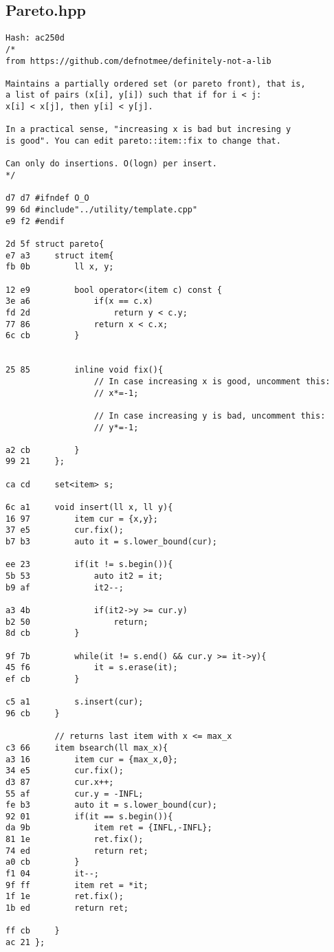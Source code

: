 \documentclass[11pt, a4paper, twoside]{article}
\begin{document}
\subsection{Pareto.hpp}
\begin{lstlisting}
Hash: ac250d
/*
from https://github.com/defnotmee/definitely-not-a-lib

Maintains a partially ordered set (or pareto front), that is,
a list of pairs (x[i], y[i]) such that if for i < j:
x[i] < x[j], then y[i] < y[j].

In a practical sense, "increasing x is bad but incresing y
is good". You can edit pareto::item::fix to change that.

Can only do insertions. O(logn) per insert.
*/

d7 d7 #ifndef O_O
99 6d #include"../utility/template.cpp"
e9 f2 #endif

2d 5f struct pareto{
e7 a3     struct item{
fb 0b         ll x, y;
      
12 e9         bool operator<(item c) const {
3e a6             if(x == c.x)
fd 2d                 return y < c.y;
77 86             return x < c.x;
6c cb         }
      
              
25 85         inline void fix(){
                  // In case increasing x is good, uncomment this:
                  // x*=-1;
      
                  // In case increasing y is bad, uncomment this:
                  // y*=-1;
                  
a2 cb         }
99 21     };
      
ca cd     set<item> s;
      
6c a1     void insert(ll x, ll y){
16 97         item cur = {x,y};
37 e5         cur.fix();
b7 b3         auto it = s.lower_bound(cur);
      
ee 23         if(it != s.begin()){
5b 53             auto it2 = it;
b9 af             it2--;
      
a3 4b             if(it2->y >= cur.y)
b2 50                 return;
8d cb         }
      
9f 7b         while(it != s.end() && cur.y >= it->y){
45 f6             it = s.erase(it);
ef cb         }
      
c5 a1         s.insert(cur);
96 cb     }
      
          // returns last item with x <= max_x
c3 66     item bsearch(ll max_x){
a3 16         item cur = {max_x,0};
34 e5         cur.fix();
d3 87         cur.x++;
55 af         cur.y = -INFL;
fe b3         auto it = s.lower_bound(cur);
92 01         if(it == s.begin()){
da 9b             item ret = {INFL,-INFL};
81 1e             ret.fix();
74 ed             return ret;
a0 cb         }
f1 04         it--;
9f ff         item ret = *it;
1f 1e         ret.fix();
1b ed         return ret;
              
ff cb     }
ac 21 };
\end{lstlisting}
\end{document}
